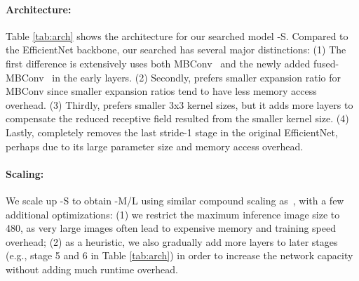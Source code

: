 \documentclass{article}
\begin{document}
\paragraph{{\xnet} Architecture:} Table \ref{tab:arch} shows the architecture for our searched model {\xnet}-S. Compared to the EfficientNet backbone, our searched {\xnet} has several major distinctions: (1) The first difference is {\xnet} extensively uses both MBConv~\cite{mobilenetv218,efficientnet19} and the newly added fused-MBConv~\cite{efficientnetedgetpu19} in the early layers. (2) Secondly, {\xnet} prefers smaller expansion ratio for MBConv since smaller expansion ratios tend to have less memory access overhead. (3) Thirdly, {\xnet} prefers smaller 3x3 kernel sizes, but it adds more layers to compensate the reduced receptive field resulted from the smaller kernel size. (4) Lastly, {\xnet} completely removes the last stride-1 stage in the original EfficientNet, perhaps due to its large parameter size and memory access overhead.

\begin{table}[t]
    \vskip -0.1in
    \caption{
        {\xnet}-S architecture -- MBConv and Fused-MBConv blocks are described in Figure \ref{fig:fusedmbconv}.
    }
    \centering

    \vskip -0.1in
\label{tab:arch}                                                    
\end{table} 
\paragraph{{\xnet} Scaling:}
We scale up {\xnet}-S to obtain {\xnet}-M/L using similar compound scaling as~\cite{efficientnet19}, with a few additional optimizations: (1) we restrict the maximum inference image size to 480, as very large images often lead to expensive memory and training speed overhead; (2) as a heuristic, we also gradually add more layers to later stages (e.g., stage 5 and 6 in Table \ref{tab:arch}) in order to increase the network capacity without adding much runtime overhead.
\end{document}
